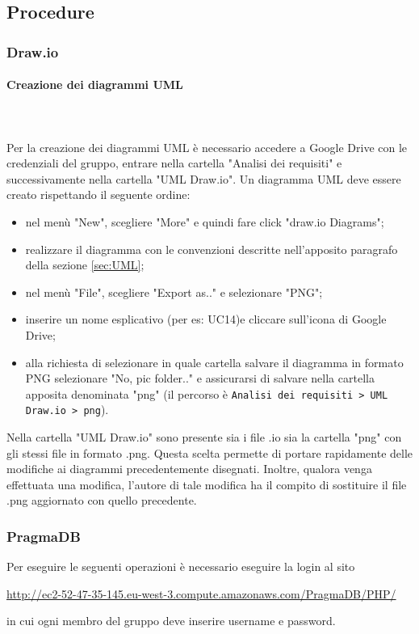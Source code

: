 \subsection{Procedure}
\subsubsection{Draw.io} 
\paragraph{Creazione dei diagrammi UML} \mbox{}\\ \mbox{}\\
Per la creazione dei diagrammi UML\glo{} è necessario accedere a Google Drive 
con le credenziali del gruppo, entrare nella cartella "Analisi dei requisiti" e 
successivamente nella cartella "UML Draw.io". Un diagramma UML deve essere creato
rispettando il seguente ordine:
	\begin{itemize}
		\item nel menù "New", scegliere "More" e quindi fare
			click "draw.io Diagrams";
		\item realizzare il diagramma con le convenzioni descritte nell'apposito
			paragrafo della sezione \ref{sec:UML}; 
		\item nel menù "File", scegliere "Export as.." e selezionare "PNG";
		\item inserire un nome esplicativo (per es: UC14)e cliccare sull'icona di
			Google Drive;
		\item alla richiesta di selezionare in quale cartella salvare il diagramma 
			in formato PNG selezionare "No, pic folder.." e assicurarsi di salvare 
			nella cartella apposita denominata "png" (il percorso è 
			\texttt{Analisi dei requisiti > UML Draw.io > png}).
	\end{itemize}
Nella cartella "UML Draw.io" sono presente sia i file .io sia la cartella "png"
con gli stessi file in formato .png. Questa scelta permette di portare rapidamente 
delle modifiche ai diagrammi precedentemente disegnati. Inoltre, qualora venga 
effettuata una modifica, l'autore di tale modifica ha il compito di sostituire
il file .png aggiornato con quello precedente. 

\subsubsection{PragmaDB} 
Per eseguire le seguenti operazioni è necessario eseguire la login al sito \\
\centerline{\url{http://ec2-52-47-35-145.eu-west-3.compute.amazonaws.com/PragmaDB/PHP/}}
in cui ogni membro del gruppo deve inserire username e password.
